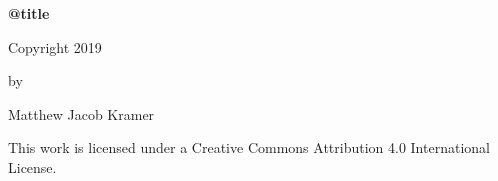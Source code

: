 \begin{center}
  \SingleSpacing \normalsize
  \textbf{\csname @title\endcsname}

  \vspace{5\baselineskip}
  Copyright 2019
  \par\vspace{\baselineskip} by
  \par\vspace{\baselineskip} Matthew Jacob Kramer

  \vspace{5\baselineskip} This work is licensed under a Creative Commons Attribution 4.0 International License.
\end{center}

\clearpage
